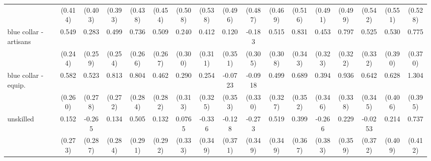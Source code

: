{\begin{tabular}{l*{16}{c}}
                    &     (0.414)         &     (0.403)         &     (0.393)         &     (0.438)         &     (0.454)         &     (0.508)         &     (0.538)         &     (0.496)         &     (0.487)         &     (0.469)         &     (0.516)         &     (0.491)         &     (0.499)         &     (0.542)         &     (0.551)         &     (0.528)         \\
[1em]
blue collar - artisans&       0.549\sym{*}  &       0.283         &       0.499\sym{*}  &       0.736\sym{**} &       0.509         &       0.240         &       0.412         &       0.120         &      -0.183         &       0.515         &       0.831\sym{*}  &       0.453         &       0.797\sym{*}  &       0.525         &       0.530         &       0.775\sym{*}  \\
                    &     (0.244)         &     (0.259)         &     (0.254)         &     (0.266)         &     (0.267)         &     (0.300)         &     (0.311)         &     (0.351)         &     (0.305)         &     (0.308)         &     (0.343)         &     (0.323)         &     (0.322)         &     (0.332)         &     (0.390)         &     (0.370)         \\
[1em]
blue collar - equip.&       0.582\sym{*}  &       0.523         &       0.813\sym{**} &       0.804\sym{**} &       0.462         &       0.290         &       0.254         &     -0.0723         &     -0.0918         &       0.499         &       0.689         &       0.394         &       0.936\sym{**} &       0.642         &       0.628         &       1.304\sym{***}\\
                    &     (0.260)         &     (0.278)         &     (0.272)         &     (0.284)         &     (0.282)         &     (0.313)         &     (0.325)         &     (0.353)         &     (0.330)         &     (0.327)         &     (0.352)         &     (0.346)         &     (0.338)         &     (0.345)         &     (0.406)         &     (0.395)         \\
[1em]
unskilled           &       0.152         &      -0.265         &       0.134         &       0.505         &       0.132         &      0.0765         &      -0.336         &      -0.128         &      -0.273         &       0.519         &       0.399         &      -0.266         &       0.229         &     -0.0253         &       0.214         &       0.737         \\
                    &     (0.273)         &     (0.287)         &     (0.284)         &     (0.291)         &     (0.292)         &     (0.333)         &     (0.349)         &     (0.371)         &     (0.349)         &     (0.349)         &     (0.367)         &     (0.383)         &     (0.359)         &     (0.372)         &     (0.409)         &     (0.412)         \\

\end{tabular}}
